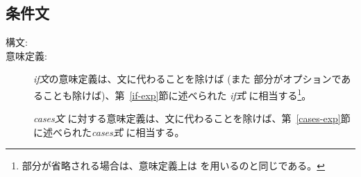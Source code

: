 \documentclass[\pformat,12pt]{jarticle}
\begin{document}
\subsection{条件文}\label{condstmt}

\begin{description}
\item[構文:]







\item[意味定義:]   {\it if文}の意味定義は、文に代わることを除けば (また  部分がオプションであることも除けば)、第~\ref{if-exp}節に述べられた {\it if式} に相当する\footnote{ 部分が省略される場合は、意味定義上は を用いるのと同じである。}。 
  
 {\it cases文} に対する意味定義は、文に代わることを除けば、第~\ref{cases-exp}節に述べられた{\it cases式} に相当する。


\end{description}
\end{document}
